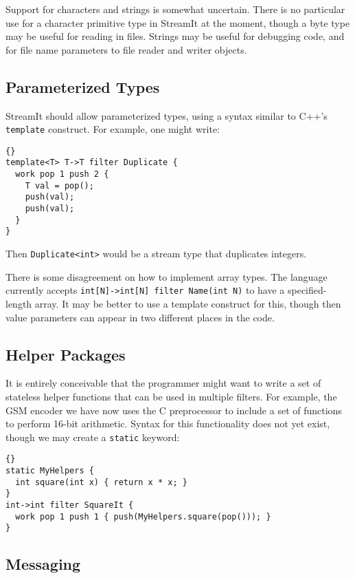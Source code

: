 \documentclass[11pt]{article}
\begin{document}
Support for characters and strings is somewhat uncertain.  There is no
particular use for a character primitive type in StreamIt at the
moment, though a byte type may be useful for reading in files.
Strings may be useful for debugging code, and for file name parameters
to file reader and writer objects.

\subsection{Parameterized Types}

StreamIt should allow parameterized types, using a syntax similar to
C++'s \lstinline|template| construct.  For example, one might write:

\begin{lstlisting}{}
template<T> T->T filter Duplicate {
  work pop 1 push 2 {
    T val = pop();
    push(val);
    push(val);
  }
}
\end{lstlisting}

Then \lstinline|Duplicate<int>| would be a stream type that duplicates
integers.

There is some disagreement on how to implement array types.  The
language currently accepts \lstinline|int[N]->int[N] filter Name(int N)| to
have a specified-length array.  It may be better to use a template
construct for this, though then value parameters can appear in two
different places in the code.

\subsection{Helper Packages}

It is entirely conceivable that the programmer might want to write a
set of stateless helper functions that can be used in multiple
filters.  For example, the GSM encoder we have now uses the C
preprocessor to include a set of functions to perform 16-bit
arithmetic.  Syntax for this functionality does not yet exist, though
we may create a \lstinline|static| keyword:

\begin{lstlisting}{}
static MyHelpers {
  int square(int x) { return x * x; }
}
int->int filter SquareIt {
  work pop 1 push 1 { push(MyHelpers.square(pop())); }
}
\end{lstlisting}

\subsection{Messaging}
\end{document}
